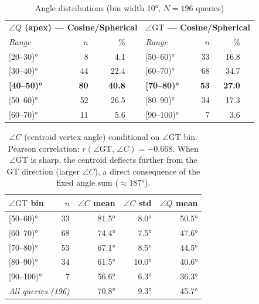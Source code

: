 \documentclass[12pt, a4paper]{article}
\begin{document}
\begin{table}[h]
\centering
\caption{Angle distributions (bin width 10\si{\degree}, $N=196$ queries)}
\label{tab:angle_hist}
\renewcommand{\arraystretch}{1.2}
\begin{tabular}{lrrr|lrrr}
\toprule
\multicolumn{4}{c|}{\textbf{$\angle Q$ (apex) --- Cosine/Spherical}}
  & \multicolumn{4}{c}{\textbf{$\angle\mathrm{GT}$ --- Cosine/Spherical}} \\
\textit{Range} & $n$ & \% & & \textit{Range} & $n$ & \% & \\
\midrule
{[}20--30)\si{\degree} &  8 &  4.1 & &  {[}50--60)\si{\degree} & 33 & 16.8 & \\
{[}30--40)\si{\degree} & 44 & 22.4 & &  {[}60--70)\si{\degree} & 68 & 34.7 & \\
\rowcolor{hdrlight}
\bfseries{[}40--50)\si{\degree} & \bfseries 80 & \bfseries 40.8 & & \bfseries{[}70--80)\si{\degree} & \bfseries 53 & \bfseries 27.0 & \\
{[}50--60)\si{\degree} & 52 & 26.5 & &  {[}80--90)\si{\degree} & 34 & 17.3 & \\
{[}60--70)\si{\degree} & 11 &  5.6 & &  {[}90--100)\si{\degree} &  7 &  3.6 & \\
\bottomrule
\end{tabular}
\end{table}

\begin{table}[h]
\centering
\caption{%
  $\angle C$ (centroid vertex angle) conditional on $\angle\mathrm{GT}$ bin.
  Pearson correlation: $r(\angle\mathrm{GT},\,\angle C) = -0.668$.
  When $\angle\mathrm{GT}$ is sharp, the centroid deflects further from the GT
  direction (larger $\angle C$), a direct consequence of the fixed angle sum
  ($\approx187\si{\degree}$).
}
\label{tab:conditional_angles}
\renewcommand{\arraystretch}{1.25}
\begin{tabular}{lrrrr}
\toprule
$\angle\mathrm{GT}$ bin & $n$
  & $\angle C$ mean & $\angle C$ std & $\angle Q$ mean \\
\midrule
{[}50--60)\si{\degree} & 33 & 81.5\si{\degree} & 8.0\si{\degree} & 50.5\si{\degree} \\
\rowcolor{rowalt}
{[}60--70)\si{\degree} & 68 & 74.4\si{\degree} & 7.5\si{\degree} & 47.6\si{\degree} \\
{[}70--80)\si{\degree} & 53 & 67.1\si{\degree} & 8.5\si{\degree} & 44.5\si{\degree} \\
\rowcolor{rowalt}
{[}80--90)\si{\degree} & 34 & 61.5\si{\degree} & 10.0\si{\degree} & 40.6\si{\degree} \\
{[}90--100)\si{\degree} &  7 & 56.6\si{\degree} &  6.3\si{\degree} & 36.3\si{\degree} \\
\midrule
\multicolumn{2}{l}{\textit{All queries (196)}}
  & 70.8\si{\degree} & 9.3\si{\degree} & 45.7\si{\degree} \\
\bottomrule
\end{tabular}
\end{table}
\end{document}
